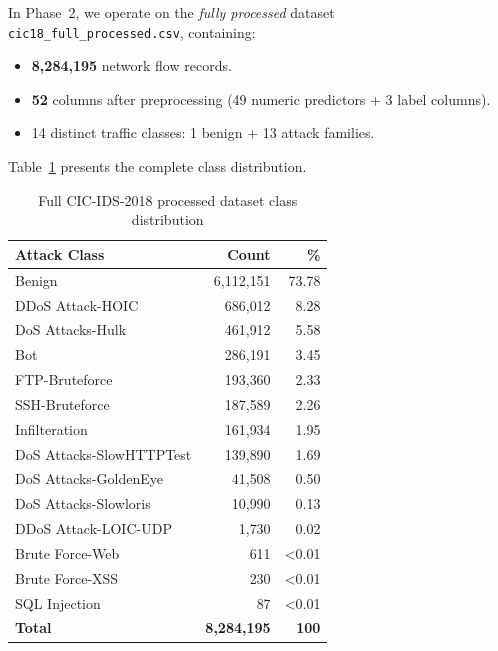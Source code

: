 \documentclass[10pt,conference]{IEEEtran}
\begin{document}
In Phase~2, we operate on the \emph{fully processed} dataset
\texttt{cic18\_full\_processed.csv}, containing:
\begin{itemize}[leftmargin=*,noitemsep]
  \item \textbf{8{,}284{,}195} network flow records.
  \item \textbf{52} columns after preprocessing (49 numeric predictors +
        3 label columns).
  \item 14 distinct traffic classes: 1 benign + 13 attack families.
\end{itemize}

Table~\ref{tab:full_dist} presents the complete class distribution.

\begin{table}[htbp]
\centering
\caption{Full CIC-IDS-2018 processed dataset class distribution}
\label{tab:full_dist}
\begin{tabular}{lrr}
\toprule
\textbf{Attack Class} & \textbf{Count} & \textbf{\%} \\
\midrule
Benign                    & 6{,}112{,}151 & 73.78 \\
DDoS Attack-HOIC          &   686{,}012   &  8.28 \\
DoS Attacks-Hulk          &   461{,}912   &  5.58 \\
Bot                       &   286{,}191   &  3.45 \\
FTP-Bruteforce            &   193{,}360   &  2.33 \\
SSH-Bruteforce            &   187{,}589   &  2.26 \\
Infilteration             &   161{,}934   &  1.95 \\
DoS Attacks-SlowHTTPTest  &   139{,}890   &  1.69 \\
DoS Attacks-GoldenEye     &    41{,}508   &  0.50 \\
DoS Attacks-Slowloris     &    10{,}990   &  0.13 \\
DDoS Attack-LOIC-UDP      &     1{,}730   &  0.02 \\
Brute Force-Web           &       611     & <0.01 \\
Brute Force-XSS           &       230     & <0.01 \\
SQL Injection             &        87     & <0.01 \\
\midrule
\textbf{Total}            & \textbf{8{,}284{,}195} & \textbf{100} \\
\bottomrule
\end{tabular}
\end{table}
\end{document}
